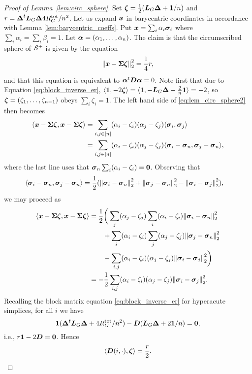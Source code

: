 \begin{proof}[Proof of Lemma~\ref{lem:circ_sphere}]
	Set $\vb*{\zeta} = \frac{1}{2}(\vb*{L}_G\vb*{\Delta}+ \vb{1}/n)$ and $r = \vb*{\Delta}^t \vb*{L}_G\vb*{\Delta} 4R^{\textnormal{tot}}_G/n^2$. 
	Let us expand $\vb*{x}$ in barycentric coordinates in accordance with Lemma \ref{lem:barycentric_coeffs}.  Put $\vb*{x}=\sum_i \alpha_i\vb*{\sigma}_i$ where $\sum_i\alpha_i=\sum_i\beta_i=1$. Let $\vb*{\alpha}=(\alpha_1,\dots,\alpha_n)$. 
	The claim is that the circumscribed sphere of $\mathcal{S}^+$ is given by the equation 
	\begin{equation}
	\label{eq:lem_circ_sphere2}
	\norm{\vb*{x} - \boldsymbol{\Sigma}\vb*{\zeta}}_2^2 = \frac{1}{4}r,
	\end{equation}
	and that this equation is equivalent to $\vb*{\alpha}^t \vb*{D}\vb*{\alpha}=0$. Note first that due to Equation \ref{eq:block_inverse_er}, $\langle \vb{1}, -2\vb*{\zeta}\rangle = \langle \vb{1}, -\vb*{L}_G\vb*{\Delta} - \frac{2}{n}\vb{1}\rangle = -2$, so $\vb*{\zeta}=(\zeta_1,\dots,\zeta_{n-1})$ obeys $\sum_i \zeta_i=1$.  The left hand side of \eqref{eq:lem_circ_sphere2} then becomes 
	\begin{align*}
	\langle \vb*{x}-\boldsymbol{\Sigma}\vb*{\zeta},\vb*{x}-\boldsymbol{\Sigma}\vb*{\zeta}\rangle &= \sum_{i,j\in[n]} (\alpha_i-\zeta_i)(\alpha_j-\zeta_j) \langle \vb*{\sigma}_i,\vb*{\sigma}_j\rangle \\
	&= \sum_{i,j\in[n]} (\alpha_i-\zeta_i)(\alpha_j-\zeta_j) \langle \vb*{\sigma}_i-\vb*{\sigma}_n,\vb*{\sigma}_j-\vb*{\sigma}_n\rangle,
	\end{align*} 
	where the last line uses that $\vb*{\sigma}_n \sum_i(\alpha_i-\zeta_i)=\vb{0}$. 
	Observing that 
	\begin{align*}
	\langle \vb*{\sigma}_i-\vb*{\sigma}_n,\vb*{\sigma}_j-\vb*{\sigma}_n\rangle &= \frac{1}{2}(\norm{\vb*{\sigma}_i-\vb*{\sigma}_n}_2^2 + \norm{\vb*{\sigma}_j-\vb*{\sigma}_n}_2^2 - \norm{\vb*{\sigma}_i-\vb*{\sigma}_j}_2^2),
	\end{align*}
	we may proceed as
	\begin{align}
	\langle\vb*{x}-\boldsymbol{\Sigma}\vb*{\zeta},\vb*{x}-\boldsymbol{\Sigma}\vb*{\zeta}\rangle &= \frac{1}{2}\bigg(\sum_j (\alpha_j-\zeta_j) \sum_i (\alpha_i-\zeta_i)\norm{\vb*{\sigma}_i-\vb*{\sigma}_n}_2^2 \notag \\
	&\qquad + \sum_i (\alpha_i-\zeta_i) \sum_j (\alpha_j-\zeta_j)\norm{\vb*{\sigma}_j-\vb*{\sigma}_n}_2^2  \notag \\
	&\qquad - \sum_{i,j} (\alpha_i-\zeta_i)(\alpha_j-\zeta_j)\norm{\vb*{\sigma}_i-\vb*{\sigma}_j}_2^2 \bigg)\notag \\
	&= -\frac{1}{2}\sum_{i,j} (\alpha_i-\zeta_i)(\alpha_j-\zeta_j)\norm{\vb*{\sigma}_i-\vb*{\sigma}_j}_2^2. \label{eq:lem_circ_sphere}
	\end{align} 
	Recalling the block matrix equation \eqref{eq:block_inverse_er} for hyperacute simplices, for all $i$ we have \[\vb{1} (\vb*{\Delta}^t \vb*{L}_G\vb*{\Delta} + 4R^{\textnormal{tot}}_G/n^2) - \vb*{D}(\vb*{L}_G\vb*{\Delta} + 2\vb{1} /n) = \vb{0},\] i.e., $r\vb{1} -2\vb*{D} =\vb{0}$. Hence 
	\[\langle \vb*{D}(i,\cdot),\vb*{\zeta}\rangle = \frac{r}{2}.\]

\end{proof}
